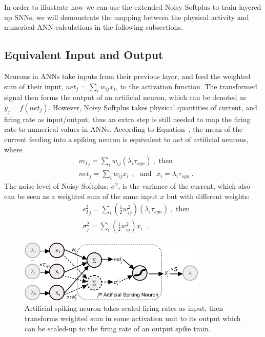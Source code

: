 \documentclass{article}
\begin{document}
In order to illustrate how we can use the extended Noisy Softplus to train layered up SNNs, we will demonstrate the mapping between the physical activity and numerical ANN calculations in the following subsections. 

\subsection{Equivalent Input and Output}

Neurons in ANNs take inputs from their previous layer, and feed the weighted sum of their input, $net_j = \sum_i w_{ij}x_i$, to the activation function.
The transformed signal then forms the output of an artificial neuron, which can be denoted as  $y_j=f(net_j)$.	
However, Noisy Softplus takes physical quantities of current, and firing rate as input/output, thus an extra step is still needed to map the firing rate to numerical values in ANNs.
According to Equation~\cite{Noisysoftplus}, the mean of the current feeding into a spiking neuron is equivalent to $net$ of artificial neurons, where
\begin{equation}
\begin{aligned}
& {m_I}_j = \sum_i w_{ij}(\lambda_{i}\tau_{syn})~, \textrm{  then}\\
& net_j= \sum_i w_{ij} x_i~~, \textrm{~~and~~}
x_i = \lambda_{i}\tau_{syn}~.
\end{aligned}
\label{equ:mi_input}
\end{equation}
The noise level of Noisy Softplus, $\sigma^2$, is the variance of the current, which also can be seen as a weighted sum of the same input $x$ but with different weights:
\begin{equation}
\begin{aligned}
& {s_I^2}_j=\sum_i(\frac{1}{2} w_{ij}^2) (\lambda_{i}\tau_{syn})~, \textrm{  then}\\
& \sigma^2_j= \sum_i (\frac{1}{2} w_{ij}^2) x_i~~.
\end{aligned}
\label{equ:si_input}
\end{equation}

\begin{figure}[bt!]
	\centering
	\includegraphics[width=0.8\textwidth]{pics_iconip/neuron_o.pdf}
	\caption{Artificial spiking neuron takes scaled firing rates as input, then transforms weighted sum in some activation unit to its output which can be scaled-up to the firing rate of an output spike train.}
	\label{Fig:sneuron}
\end{figure}
\end{document}
